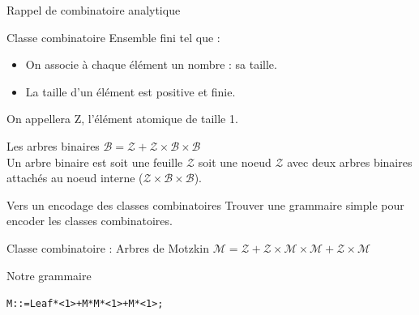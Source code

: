 \documentclass{beamer}
\begin{document}
\begin{frame}{Rappel de combinatoire analytique}
\begin{block}{Classe combinatoire}
Ensemble fini tel que : \\
\begin{itemize}
\item  On associe à chaque élément un nombre : sa taille.
\item La taille d'un élément est positive et finie.
\end{itemize}

On appellera Z, l'élément atomique de taille 1.
\end{block}
\begin{exampleblock}{Les arbres binaires}
$\mathcal{B} = \mathcal{Z} + \mathcal{Z} \times \mathcal{B} \times \mathcal{B}$ \\
Un arbre binaire est soit une feuille $\mathcal{Z}$ soit une noeud $\mathcal{Z}$ avec deux arbres binaires attachés au noeud interne ($\mathcal{Z} \times \mathcal{B} \times \mathcal{B}$).
\end{exampleblock}
\end{frame}



\begin{frame}{Vers un encodage des classes combinatoires }
Trouver une grammaire simple pour encoder les classes combinatoires. \newline
\begin{block}{Classe combinatoire : Arbres de Motzkin}
\center
$\mathcal{M} = \mathcal{Z} + \mathcal{Z} \times \mathcal{M} \times \mathcal{M} + \mathcal{Z} \times \mathcal{M}$ \\  %
\end{block}
\vspace{0.5cm}
\begin{block}{Notre grammaire}
\begin{alltt}
\center
M ::= Leaf * <1> + M * M * <1> + M * <1>;
\end{alltt}
\end{block}
\end{frame}
\end{document}
